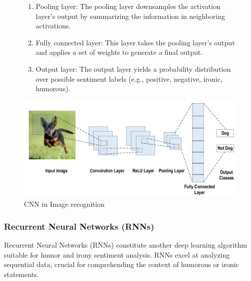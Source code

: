 \documentclass[a4paper]{article}
\begin{document}
\begin{figure}[H]
\begin{minipage}{0.48\textwidth}
\begin{enumerate}
            \item Pooling layer: The pooling layer downsamples the activation layer's output by summarizing the information in neighboring activations.
            \item Fully connected layer: This layer takes the pooling layer's output and applies a set of weights to generate a final output.
            \item Output layer: The output layer yields a probability distribution over possible sentiment labels (e.g., positive, negative, ironic, humorous).
        \end{enumerate}
    \end{minipage}
\end{figure}

\begin{figure}
    \centering
    \includegraphics[width=0.8\linewidth]{./images/CNN_architecture_2.png}
    \caption{CNN in Image recognition}
    \label{fig.CNN_2}
\end{figure}

\subsubsection{Recurrent Neural Networks (RNNs)}

Recurrent Neural Networks (RNNs) constitute another deep learning algorithm suitable for humor and irony sentiment analysis. RNNs excel at analyzing sequential data, crucial for comprehending the context of humorous or ironic statements.
\end{document}
